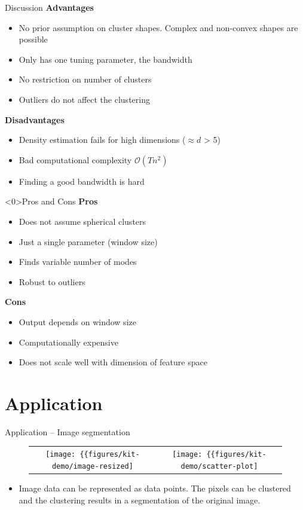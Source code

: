 \documentclass[18pt]{beamer}
\begin{document}
\begin{frame}{Discussion}
	\textbf{Advantages}
	\begin{itemize}
		\item No prior assumption on cluster shapes. Complex and non-convex shapes are possible
		\item Only has one tuning parameter, the bandwidth
		\item No restriction on number of clusters
		\item Outliers do not affect the clustering
	\end{itemize}
	\textbf{Disadvantages}
	\begin{itemize}
		\item Density estimation fails for high dimensions ($\approx d$ > 5)
		\item Bad computational complexity $\mathcal{O}(Tn^2)$
		\item Finding a good bandwidth is hard
	\end{itemize}
\end{frame}

\begin{frame}<0>{Pros and Cons}
	\textbf{Pros}
	\begin{itemize}
		\item Does not assume spherical clusters
		\item Just a single parameter (window size)
		\item Finds variable number of modes
		\item Robust to outliers
	\end{itemize}
	\textbf{Cons}
	\begin{itemize}
		\item Output depends on window size
		\item Computationally expensive
		\item Does not scale well with dimension of feature space
	\end{itemize}
\end{frame}


\section{Application}

\begin{frame}{Application -- Image segmentation}
\begin{figure}	
	\begin{tabular}{cc}
		\texttt{[image: \{\{figures/kit-demo/image-resized]}}} &
		\texttt{[image: \{\{figures/kit-demo/scatter-plot]}}}
	\end{tabular}
\end{figure}
\begin{itemize}
	\item Image data can be represented as data points. The pixels can be clustered and the clustering results in a segmentation of the original image.
\end{itemize}
\end{frame}
\end{document}
